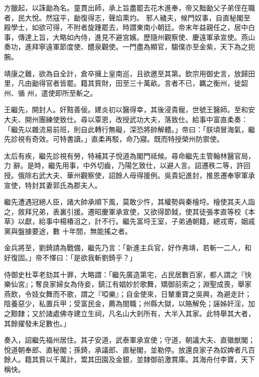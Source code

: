 \begin{pinyinscope}
 方臘起，以誅勔為名。童貫出師，承上旨盡罷去花木進奉，帝又黜勔父子弟侄在職者，民大悅。然寇平，勔復得志，聲焰熏灼。
 邪人穢夫，候門奴事，自直秘閣至殿學士，如欲可得，不附者旋踵罷去，時謂東南小朝廷。帝末年益親任之，居中白事，傳達上旨，大略如內侍，進見不避宮嬪。歷隨州觀察使、慶遠軍承宣使。燕山奏功，進拜寧遠軍節度使、醴泉觀使。一門盡為顯官，騶僕亦至金紫，天下為之扼腕。



 靖康之難，欲為自全計，倉卒擁上皇南巡，且欲邀至其第。欽宗用御史言，放歸田里，凡由勔得官者皆罷。籍其貲財，田至三十萬畝。言者不已，羈之衡州，徙韶州、循
 州，遣使即所至斬之。



 王繼先，開封人。奸黠善佞。建炎初以醫得幸，其後浸貴寵，世號王醫師。至和安大夫、開州團練使致仕。尋以覃恩，改授武功大夫，落致仕。給事中富直柔奏：「繼先以雜流易前班，則自此轉行無礙，深恐將帥解體。」帝曰：「朕頃冒海氣，繼先診視有奇效。可特書讀。」直柔再駁，命乃寢。既而特授榮州防禦使。



 太后有疾，繼先診視有勞，特補其子悅道為閣門祗候。尋命繼先主管翰林醫官局，力
 辭。是時，繼先用事，中外切齒，乃陽乞致仕，以避人言。詔遷秩二等，許回授。俄除右武大夫、華州觀察使，詔餘人毋得援例。吳貴妃進封，推恩遷奉寧軍承宣使，特封其妻郭氏為郡夫人。



 繼先遭遇冠絕人臣，諸大帥承順下風，莫敢少忤，其權勢與秦檜埒。檜使其夫人詣之，敘拜兄弟，表裏引援。遷昭慶軍承宣使，又欲得節鉞，使其徒張孝直等校《本草》以獻，給事中楊椿沮之，計不行。繼先富埒王室，子弟通朝籍，總戎寄，姻戚黨與盤據要途，數
 十年間，無能搖之者。



 金兵將至，劉錡請為戰備，繼先乃言：「新進主兵官，好作弗靖，若斬一二人，和好復固。」帝不懌曰：「是欲我斬劉錡乎？」



 侍御史杜莘老劾其十罪，大略謂：「繼先廣造第宅，占民居數百家，都人謂之『快樂仙宮』；奪良家婦女為侍妾，鎮江有娼妙於歌舞，矯御前索之；淵聖成喪，舉家燕飲，令妓女舞而不歌，謂之『啞樂』；自金使來，日輦重寶之吳興，為避走計；陰養惡少，私置兵甲；受富民金，薦為閤職；州縣大獄，以賂解免；誣姊奸淫，加
 之黥隸；又於諸處佛寺建立生祠，凡名山大剎所有，大半入其家。此特舉其大者，其餘擢發未足數也。」



 奏入，詔繼先福州居住。其子安道，武泰軍承宣使；守道，朝議大夫、直徽猷閣；悅道朝奉郎、直秘閣；孫錡，承議郎、直秘閣，並勒停。放還良家子為奴婢者凡百餘人。籍其貲以千萬計，鬻其田園及金銀，並隸御前激賞庫。其海舟付李寶，天下稱快。




\end{pinyinscope}
